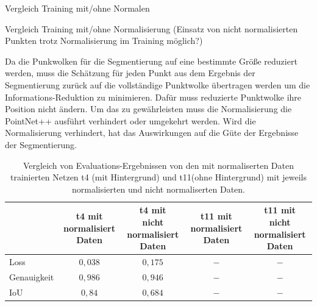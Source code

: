 \documentclass[12pt,titlepage, twoside]{article}
\begin{document}
Vergleich Training mit/ohne Normalen

Vergleich Training mit/ohne Normalisierung (Einsatz von nicht normalisierten Punkten trotz Normalisierung im Training möglich?)

Da die Punkwolken für die Segmentierung auf eine bestimmte Größe reduziert werden, muss die Schätzung für jeden Punkt aus dem Ergebnis der Segmentierung zurück auf die vollständige Punktwolke übertragen werden um die Informations-Reduktion zu minimieren.
Dafür muss reduzierte Punktwolke ihre Position nicht ändern. Um das zu gewährleisten muss die Normalisierung die PointNet++ ausführt verhindert oder umgekehrt werden. Wird die Normalisierung verhindert, hat das Auswirkungen auf die Güte der Ergebnisse der Segmentierung.


%
%
%
%
%
%
%

\begin{table}
    \begin{center}
    \begin{tabular}{|l || c | c || c | c | } 
        \hline
         & \thead{t4 mit \\ normalisiert Daten}  & \thead{t4 mit \\ nicht normalisiert Daten} & \thead{t11 mit \\ normalisiert Daten} & \thead{t11 mit \\ nicht normalisiert Daten}  \\  
        \hline
        \hline
        Loss & $0,038$ & $0,175$& $-$& $-$\\
        \hline
        Genauigkeit & $0,986$& $0,946$& $-$& $-$\\
        \hline
        IoU & $0,84$& $0,684$& $-$& $-$\\
        \hline
    \end{tabular}
    \end{center}
    \caption{Vergleich von Evaluations-Ergebnissen von den mit normaliserten Daten trainierten Netzen t4 (mit Hintergrund) und t11(ohne Hintergrund) mit jeweils normalisierten und nicht normaliserten Daten.}
    \label{tab:registration:deeplearn:compare}
\end{table}
\end{document}
